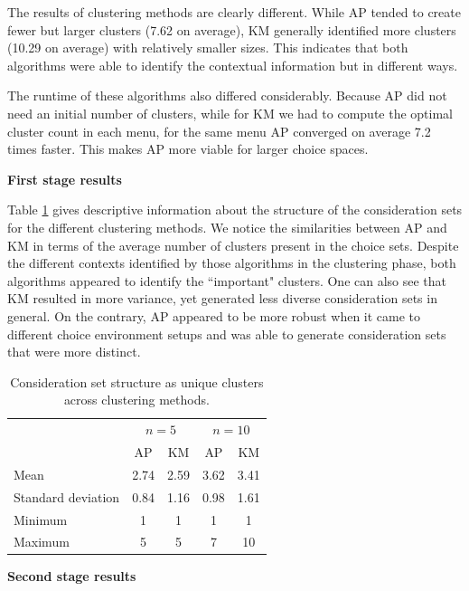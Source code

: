 \documentclass[a4paper,12pt]{article}
\begin{document}
The results of clustering methods are clearly different. While AP tended to create fewer but larger clusters (7.62 on average), KM generally identified more clusters (10.29 on average)  with relatively smaller sizes. This indicates that both algorithms were able to identify the contextual information but in different ways. 

The runtime of these algorithms also differed considerably. Because AP did not need an initial number of clusters, while for KM we had to compute the optimal cluster count in each menu, for the same menu AP converged on average 7.2 times faster. This makes AP more viable for larger choice spaces.

\textbf{First stage results}

Table \ref{tab:desciptiveResultsTwoStageChoiceModelFirstStage} gives descriptive information about the structure of the consideration sets for the different clustering methods. We notice the similarities between AP and KM in terms of the average number of clusters present in the choice sets. Despite the different contexts identified by those algorithms in the clustering phase, both algorithms appeared to identify the ``important" clusters. One can also see that KM resulted in more variance, yet generated less diverse consideration sets in general. On the contrary, AP appeared to be more robust when it came to different choice environment setups and was able to generate consideration sets that were more distinct. 


\begin{table}[!h]
    \centering
    \begin{tabular}{lcccc}\hline
     & \multicolumn{2}{c}{$n=5$} & \multicolumn{2}{c}{$n=10$}\\
     & AP & KM & AP & KM\\\hline
    Mean & 2.74 & 2.59 & 3.62 & 3.41\\
    Standard deviation\hspace{5mm} & 0.84 & 1.16 & 0.98 & 1.61\\
    Minimum & 1 & 1 & 1 & 1\\
    Maximum & 5 & 5 & 7 & 10\\\hline
    \end{tabular}
    \caption{Consideration set structure as unique clusters across clustering methods.}
    \label{tab:desciptiveResultsTwoStageChoiceModelFirstStage}
\end{table}

\textbf{Second stage results}
\end{document}
